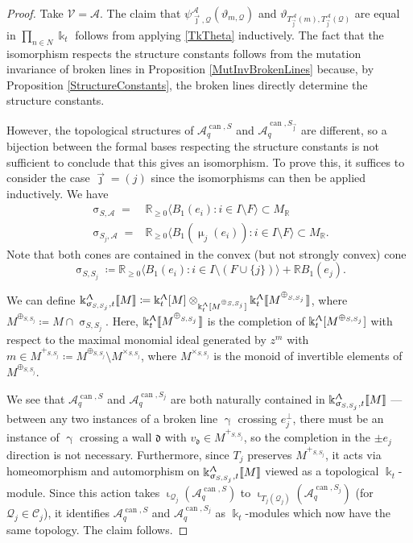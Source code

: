 \documentclass{amsart}
\DeclareMathOperator{\can}{can}
\let\llb=\llbracket
\let\rrb=\rrbracket
\let\bb=\mathbb
\let\f=\mathfrak
\let\s=\mathcal
\newcommand {\kk} {\Bbbk}
\newcommand {\sQ} {\mathcal{Q}}
\newcommand {\jj} {\vec{\jmath}}
\renewcommand{\iota}{\upiota}
\renewcommand{\gamma}{\upgamma}
\renewcommand{\sigma}{\upsigma}
\renewcommand{\Lambda}{\Uplambda}
\renewcommand{\mu}{\upmu}
\theoremstyle{plain}%
\theoremstyle{definition}
\theoremstyle{remark}
\begin{document}
\begin{proof}
Take $\s{V}=\s{A}$.  The claim that $\psi_{\jj,\sQ}^{\s{A}}(\vartheta_{m,\sQ})$ and $\vartheta_{T_{\jj}^{\s{A}}(m),T_{\jj}^{\s{A}}(\sQ)}$ are equal in $\prod_{n\in N} \kk_t$ follows from applying \eqref{TkTheta} inductively. The fact that the isomorphism respects the structure constants follows from the mutation invariance of broken lines in Proposition \ref{MutInvBrokenLines} because, by Proposition \ref{StructureConstants}, the broken lines directly determine the structure constants.

However, the topological structures of $\s{A}_q^{\can,S}$ and $\s{A}_q^{\can,S_{\jj}}$ are different, so a bijection between the formal bases respecting the structure constants is not sufficient to conclude that this gives an isomorphism.  To prove this, it suffices to consider the case $\jj=(j)$ since the isomorphisms can then be applied inductively.  We have \begin{align*}
    \sigma_{S,\s{A}}=&\bb{R}_{\geq 0} \langle B_1(e_i)\colon i\in I\setminus F\rangle\subset M_{\bb{R}}\\
    \sigma_{S_{j},\s{A}}=&\bb{R}_{\geq 0}\langle B_1(\mu_j(e_i))\colon i\in I\setminus F\rangle\subset M_{\bb{R}}.
\end{align*}
Note that both cones are contained in the convex (but not strongly convex) cone $$\sigma_{S,S_j}\coloneqq \bb{R}_{\geq 0}\langle B_1(e_i)\colon i\in I\setminus (F\cup \{j\})\rangle+\bb{R}B_1(e_j).$$

We can define $\kk_{\sigma_{S,S_j},t}^{\Lambda}\llb M\rrb\coloneqq \kk_t^{\Lambda}[M]\otimes_{\kk_t^{\Lambda}[M^{\oplus_{S,S_{j}}}]}\kk_t^{\Lambda}\llb M^{\oplus_{_{S,S_{j}}}}\rrb$, where $M^{\oplus_{S,S_j}}\coloneqq M\cap \sigma_{S,S_j}$.  Here, $\kk_t^{\Lambda}\llb M^{\oplus_{_{S,S_{j}}}}\rrb$ is the completion of $\kk_t^{\Lambda}[M^{\oplus_{S,S_j}}]$ with respect to the maximal monomial ideal generated by $z^m$ with $m\in M^{+_{S,S_j}}\coloneqq M^{\oplus_{S,S_j}}\setminus M^{\times_{S,S_j}}$, where $M^{\times_{S,S_j}}$ is the monoid of invertible elements of $M^{\oplus_{S,S_j}}$. 

We see that $\s{A}_q^{\can,S}$ and $\s{A}_q^{\can,S_j}$ are both naturally contained in $\kk_{\sigma_{S,S_j},t}^{\Lambda}\llb M\rrb$ --- between any two instances of a broken line $\gamma$ crossing $e_j^{\perp}$, there must be an instance of $\gamma$ crossing a wall $\f{d}$ with $v_{\f{d}}\in M^{+_{S,S_j}}$, so the completion in the $\pm e_j$ direction is not necessary.  Furthermore, since $T_j$ preserves $M^{+_{S,S_j}}$, it acts via homeomorphism and automorphism on $\kk_{\sigma_{S,S_j},t}^{\Lambda}\llb M\rrb$ viewed as a topological $\kk_t$-module.  Since this action takes $\iota_{\sQ_j}(\s{A}_q^{\can,S})$ to $\iota_{T_j(\sQ_j)}(\s{A}_q^{\can,S_j})$ (for $\sQ_j\in \s{C}_j$), it identifies $\s{A}_q^{\can,S}$ and $\s{A}_q^{\can,S_j}$ as $\kk_t$-modules which now have the same topology.   The claim follows. 


\end{proof}
\end{document}
